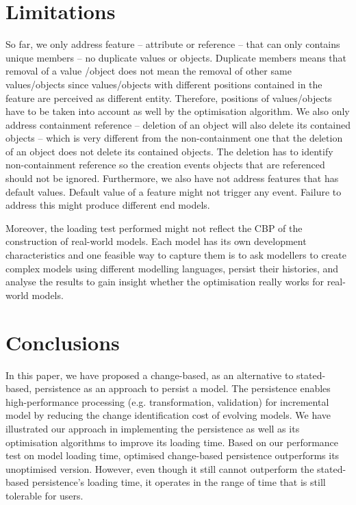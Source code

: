 \documentclass{llncs}
\begin{document}
{\section{Limitations}
\label{sec:limitations}
So far, we only address feature -- attribute or reference -- that can only contains unique members -- no duplicate values or objects. Duplicate members means that removal of a value /object does not mean the removal of other same values/objects since values/objects with different positions contained in the feature are perceived as different entity. Therefore, positions of values/objects have to be taken into account as well by the optimisation algorithm. We also only address containment reference -- deletion of an object will also delete its contained objects -- which is very different from the non-containment one that the deletion of an object does not delete its contained objects. The deletion has to identify non-containment reference so the creation events objects that are referenced should not be ignored. Furthermore, we also have not address features that has default values. Default value of a feature might not trigger any event. Failure to address this might produce different end models. 

Moreover, the loading test performed might not reflect the CBP of the construction of real-world models. Each model has its own development characteristics and one feasible way to capture them is to ask modellers to create complex models using different modelling languages, persist their histories, and analyse the results to gain insight whether the optimisation really works for real-world models. 

\section{Conclusions}
\label{sec:conclusions}
In this paper, we have proposed a change-based, as an alternative to stated-based, persistence as an approach to persist a model. The persistence enables high-performance processing (e.g. transformation, validation) for incremental model by reducing the change identification cost of evolving models. We have illustrated our approach in implementing the persistence as well as its optimisation algorithms to improve its loading time. Based on our performance test on model loading time, optimised change-based persistence outperforms its unoptimised version. However, even though it still cannot outperform the stated-based persistence's loading time, it operates in the range of time that is still tolerable for users. 

}
\end{document}
